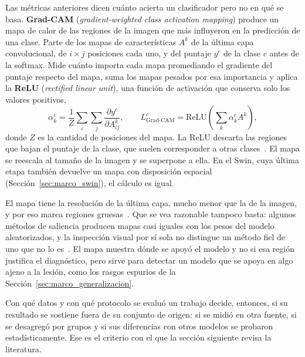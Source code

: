 Las métricas anteriores dicen cuánto acierta un clasificador pero no en qué se basa. \textbf{Grad-CAM}
(\emph{gradient-weighted class activation mapping}) produce un mapa de calor de las regiones de la imagen que
más influyeron en la predicción de una clase. Parte de los mapas de características $A^k$ de la última capa
convolucional, de $i \times j$ posiciones cada uno, y del puntaje $y^c$ de la clase $c$ antes de la softmax.
Mide cuánto importa cada mapa promediando el gradiente del puntaje respecto del mapa, suma los mapas pesados
por esa importancia y aplica la \textbf{ReLU} (\emph{rectified linear unit}), una función de activación que
conserva solo los valores positivos,
\begin{equation}
    \alpha_k^c = \frac{1}{Z}\sum_{i}\sum_{j} \frac{\partial y^c}{\partial A^k_{ij}}, \qquad
    L^c_{\text{Grad-CAM}} = \mathrm{ReLU}\!\left(\sum_k \alpha_k^c A^k\right),
    \label{eq:marco_gradcam}
\end{equation}
donde $Z$ es la cantidad de posiciones del mapa. La ReLU descarta las regiones que bajan el puntaje de la
clase, que suelen corresponder a otras clases~\cite{selvaraju2017gradcam}. El mapa se reescala al tamaño de
la imagen y se superpone a ella. En el Swin, cuya última etapa también devuelve un mapa con disposición
espacial (Sección~\ref{sec:marco_swin}), el cálculo es igual.

El mapa tiene la resolución de la última capa, mucho menor que la de la imagen, y por eso marca regiones
gruesas~\cite{selvaraju2017gradcam}. Que se vea razonable tampoco basta: algunos métodos de saliencia
producen mapas casi iguales con los pesos del modelo aleatorizados, y la inspección visual por sí sola no
distingue un método fiel de uno que no lo es~\cite{adebayo2018sanity}. El mapa muestra dónde se apoyó el
modelo y no si esa región justifica el diagnóstico, pero sirve para detectar un modelo que se apoya en algo
ajeno a la lesión, como los rasgos espurios de la Sección~\ref{sec:marco_generalizacion}.

Con qué datos y con qué protocolo se evaluó un trabajo decide, entonces, si su resultado se sostiene fuera de su
conjunto de origen: si se midió en otra fuente, si se desagregó por grupos y si sus diferencias con otros modelos
se probaron estadísticamente. Ese es el criterio con el que la sección siguiente revisa la literatura.
